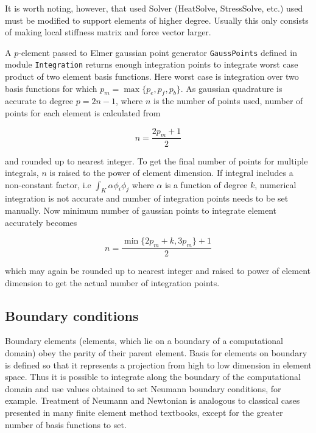 It is worth noting, however, that used Solver (HeatSolve, StressSolve, etc.) used must be modified to support elements of higher degree. Usually this only consists of making local stiffness matrix and force vector larger. 

A $p$-element passed to Elmer gaussian point generator \texttt{GaussPoints} defined in module \texttt{Integration} returns enough integration points to integrate worst case product of two element basis functions. Here worst case is integration over two basis functions for which $p_m=\max\{p_e,p_f,p_b\}$. As gaussian quadrature is accurate to degree $p=2n-1$, where $n$ is the number of points used, number of points for each element is calculated from 

\begin{equation}
n=\frac{2p_m+1}{2}
\end{equation} 

\noindent and rounded up to nearest integer. To get the final number of points for multiple integrals, $n$ is raised to the power of element dimension. If integral includes a non-constant factor, i.e $\int_K \alpha \phi_i\phi_j$ where $\alpha$ is a function of degree $k$, numerical integration is not accurate and number of integration points needs to be set manually. Now minimum number of gaussian points to integrate element accurately becomes

\begin{equation}
n=\frac{\min{\{2p_m+k,3p_m\}}+1}{2}
\end{equation}

\noindent which may again be rounded up to nearest integer and raised to power of element dimension to get the actual number of integration points. 

\subsection{Boundary conditions}

Boundary elements (elements, which lie on a boundary of a computational domain) obey the parity of their parent element. Basis for elements on boundary is defined so that it represents a projection from high to low dimension in element space. Thus it is possible to integrate along the boundary of the computational domain and use values obtained to set Neumann boundary conditions, for example. Treatment of Neumann and Newtonian is analogous to classical cases presented in many finite element method textbooks, except for the greater number of basis functions to set. 

